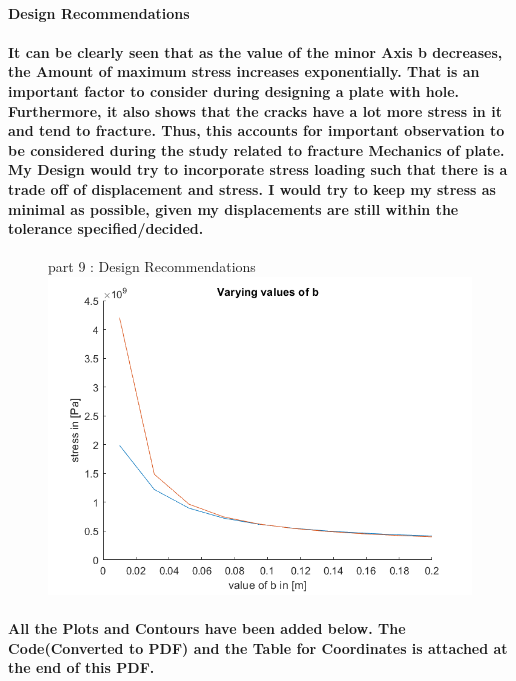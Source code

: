 \documentclass{article}
\begin{document}
\paragraph*{Design Recommendations}

\paragraph{It can be clearly seen that as the value of the minor Axis b decreases, the Amount of maximum stress increases exponentially. That is an important factor to consider during designing a plate with hole. Furthermore, it also shows that the cracks have a lot more stress in it and tend to fracture. Thus, this accounts for important observation to be considered during the study related to fracture Mechanics of plate. My Design would try to incorporate stress loading such that there is a trade off of displacement and stress. I would try to keep my stress as minimal as possible, given my displacements are still within the tolerance specified/decided.}

\begin{figure}[t]
	part 9 : Design Recommendations
	\includegraphics[width=20cm]{tot_ingle_comp}
	\centering
\end{figure}


\paragraph{All the Plots and Contours have been added below. The Code(Converted to PDF) and the Table for Coordinates is attached at the end of this PDF.}
\end{document}
